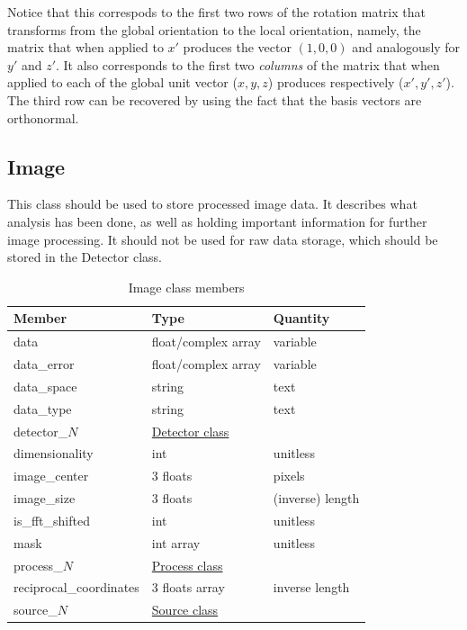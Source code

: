 \documentclass[usletter,11pt]{article}
\begin{document}
Notice that this correspods to the first two rows of the rotation
matrix that transforms from the global orientation to the local
orientation, namely, the matrix that when applied to $x'$ produces
the vector $(1,0,0)$ and analogously for $y'$ and $z'$.
It also corresponds to the first two {\em columns} of
the matrix that when applied to each of the global unit vector
($x,y,z$) produces respectively ($x',y',z'$).
The third row can be recovered by using the fact that the
basis vectors are orthonormal.

\subsection{Image}
\label{table:image}

This class should be used to store processed image data. It describes
what analysis has been done, as well as holding important information
for further image processing. It should not be used for raw data
storage, which should be stored in the Detector class.

\begin{table}[h!]\sffamily \footnotesize
\caption{Image class members}

\begin{tabular}{p{4.5cm} p{4.5cm}  p{2.5cm} }

\toprule
\bfseries Member     & \bfseries Type & \bfseries Quantity \\
\midrule
data &  float/complex array & variable \\
data\_error & float/complex array & variable \\
data\_space & string & text \\
data\_type & string & text \\
detector\_$N$ &  \hyperref[table:detector]{Detector class} & \\
dimensionality & int & unitless \\
image\_center & 3 floats & pixels \\
image\_size & 3 floats & (inverse) length \\
is\_fft\_shifted & int & unitless \\ 
mask & int array & unitless \\
process\_$N$ &  \hyperref[table:process]{Process class} & \\
reciprocal\_coordinates & 3 floats array & inverse length  \\
source\_$N$ &  \hyperref[table:source]{Source class} & \\
\bottomrule
\end{tabular}
\end{table}
\end{document}
